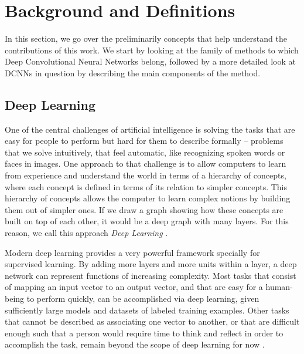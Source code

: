 \chapter{Background and Definitions}
\label{sec:Background}
In this section, we go over the preliminarily concepts that help understand the contributions of this work. We start by looking at the family of methods to which Deep Convolutional Neural Networks belong, followed by a more detailed look at DCNNs in question by describing the main components of the method.

\section{Deep Learning}
\label{sec:dl}
One of the central challenges of artificial intelligence is solving the tasks that are easy for people to perform but hard for them to describe formally -- problems that we solve intuitively, that feel automatic, like recognizing spoken words or faces in images. One approach to that challenge is to allow computers to learn from experience and understand the world in terms of a hierarchy of concepts, where each concept is defined in terms of its relation to simpler concepts. This hierarchy of concepts allows the computer to learn complex notions by building them out of simpler ones. If we draw a graph showing how these concepts are built on top of each other, it would be a deep graph with many layers. For this reason, we call this approach \textit{Deep Learning} \cite{Goodfellow-et-al-2016-Book}.

Modern deep learning provides a very powerful framework specially for supervised learning. By adding more layers and more units within a layer, a deep network can represent functions of increasing complexity. Most tasks that consist of mapping an input vector to an output vector, and that are easy for a human-being to perform quickly, can be accomplished via deep learning, given sufficiently large models and datasets of labeled training examples. Other tasks that cannot be described as associating one vector to another, or that are difficult enough such that a person would require time to think and reflect in order to accomplish the task, remain beyond the scope of deep learning for now \cite{Goodfellow-et-al-2016-Book}.

